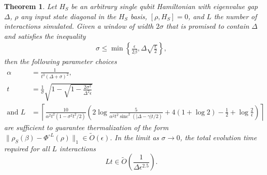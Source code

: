 \documentclass{article}
\newtheorem{theorem}{Theorem}
\newcommand{\norm}[1]{\| #1 \|}
\newcommand{\set}[1]{\left\{ #1 \right\}}
\newcommand{\bigotilde}[1]{\widetilde{O} \left( #1 \right)}
\DeclareMathOperator{\sinc}{sinc}
\begin{document}
\begin{theorem} \label{thm:single_qubit}
    Let $H_S$ be an arbitrary single qubit Hamiltonian with eigenvalue gap $\Delta$, $\rho$ any input state diagonal in the $H_S$ basis, $[\rho, H_S] = 0$, and $L$ the number of interactions simulated. Given a window of width $2 \sigma$ that is promised to contain $\Delta$ and satisfies the inequality
    \begin{align}
        \sigma \le \min \set{\frac{\epsilon}{2\beta}, \Delta \sqrt{\frac{\epsilon}{2}}},
    \end{align}
    then the following parameter choices 
    \begin{align}
        \alpha &= \frac{1}{t^3(\Delta + \sigma)^2}, \nonumber \\
        t &=\frac{1}{\sigma}\sqrt{1 - \sqrt{1 - \frac{2 \sigma^2}{\Delta^2 \epsilon}} }\nonumber\\
        \text{and } L &= \left\lceil\frac{10}{\alpha^2 t^2 (1 - \sigma^2 t^2 / 2)} \left( 2 \log \frac{5}{\alpha^2 t^2 \sinc^2(|\Delta - \gamma|t/2)} + 4( 1 + \log 2) - \frac{1}{2} + \log \frac{2}{\epsilon} \right)\right\rceil
    \end{align}
    are sufficient to guarantee thermalization of the form $\norm{\rho_S(\beta) - \Phi^{\circ L}(\rho)}_1 \in \bigotilde{\epsilon}$. In the limit as $\sigma \to 0$, the total evolution time required for all $L$ interactions 
    \begin{equation}
        Lt \in \widetilde{O} \left( \frac{1}{\Delta \epsilon^{2.5}}\right).
    \end{equation}
\end{theorem}
\end{document}

